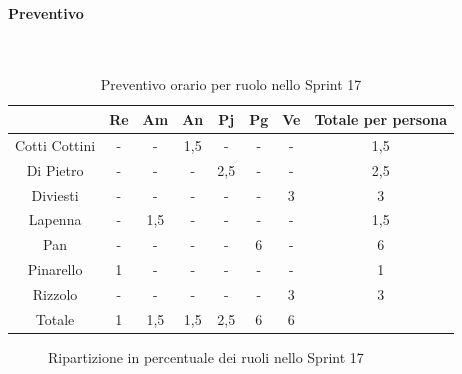 \documentclass{article}
\begin{document}
            \paragraph{Preventivo}\mbox{}\\
            \begin{table}[H]
                \centering
                \begin{tabular}{|c|c|c|c|c|c|c|c|}
                \hline
                              & Re  & Am  & An  & Pj  & Pg  & Ve  & Totale per persona \\ \hline
                Cotti Cottini & -   & -   & 1,5 & -   & -   & -   & 1,5                \\ \hline
                Di Pietro     & -   & -   & -   & 2,5 & -   & -   & 2,5                \\ \hline
                Diviesti      & -   & -   & -   & -   & -   & 3   & 3                  \\ \hline
                Lapenna       & -   & 1,5 & -   & -   & -   & -   & 1,5                \\ \hline
                Pan           & -   & -   & -   & -   & 6   & -   & 6                  \\ \hline
                Pinarello     & 1   & -   & -   & -   & -   & -   & 1                  \\ \hline
                Rizzolo       & -   & -   & -   & -   & -   & 3   & 3                  \\ \hline
                Totale        & 1   & 1,5 & 1,5 & 2,5 & 6   & 6   &                    \\ \hline
                \end{tabular}
                \caption{Preventivo orario per ruolo nello Sprint 17}
            \end{table}


            \begin{figure}[H]
                \centering
                \caption{Ripartizione in percentuale dei ruoli nello Sprint 17}
            \end{figure}


\end{document}
